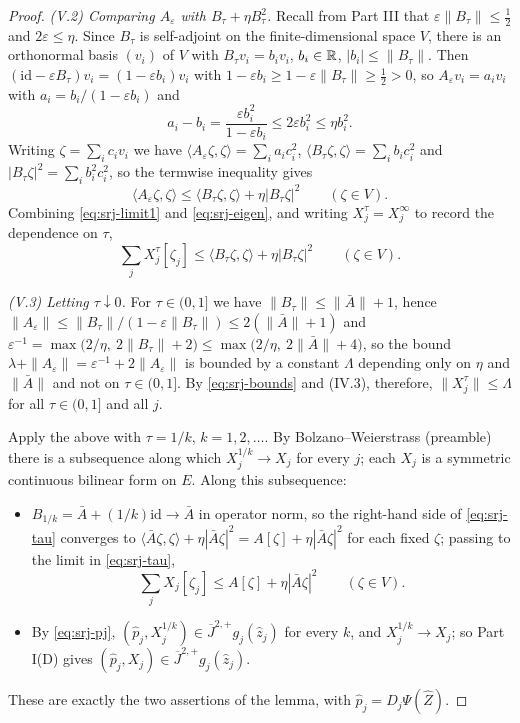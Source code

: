 \begin{proof}
\emph{(V.2) Comparing $A_\varepsilon$ with $B_\tau+\eta B_\tau^2$.}
Recall from Part III that $\varepsilon\|B_\tau\|\le\tfrac12$ and
$2\varepsilon\le\eta$. Since $B_\tau$ is self-adjoint on the
finite-dimensional space $V$, there is an orthonormal basis $(v_i)$ of $V$ with
$B_\tau v_i=b_iv_i$, $b_i\in\mathbb{R}$, $|b_i|\le\|B_\tau\|$. Then
$(\mathrm{id}-\varepsilon B_\tau)v_i=(1-\varepsilon b_i)v_i$ with
$1-\varepsilon b_i\ge1-\varepsilon\|B_\tau\|\ge\tfrac12>0$, so
$A_\varepsilon v_i=a_iv_i$ with $a_i=b_i/(1-\varepsilon b_i)$ and
\[
  a_i-b_i=\frac{\varepsilon b_i^2}{1-\varepsilon b_i}\le2\varepsilon b_i^2
   \le\eta b_i^2 .
\]
Writing $\zeta=\sum_ic_iv_i$ we have $\langle A_\varepsilon\zeta,\zeta\rangle
=\sum_ia_ic_i^2$, $\langle B_\tau\zeta,\zeta\rangle=\sum_ib_ic_i^2$ and
$|B_\tau\zeta|^2=\sum_ib_i^2c_i^2$, so the termwise inequality gives
\begin{equation}\label{eq:srj-eigen}
  \langle A_\varepsilon\zeta,\zeta\rangle
   \le\langle B_\tau\zeta,\zeta\rangle+\eta|B_\tau\zeta|^2\qquad(\zeta\in V).
\end{equation}
Combining \eqref{eq:srj-limit1} and \eqref{eq:srj-eigen}, and writing
$X_j^{\tau}=X_j^\infty$ to record the dependence on $\tau$,
\begin{equation}\label{eq:srj-tau}
  \sum_jX_j^{\tau}[\zeta_j]
   \le\langle B_\tau\zeta,\zeta\rangle+\eta|B_\tau\zeta|^2\qquad(\zeta\in V).
\end{equation}

\emph{(V.3) Letting $\tau\downarrow0$.}
For $\tau\in(0,1]$ we have $\|B_\tau\|\le\|\bar A\|+1$, hence
$\|A_\varepsilon\|\le\|B_\tau\|/(1-\varepsilon\|B_\tau\|)\le2(\|\bar A\|+1)$ and
$\varepsilon^{-1}=\max\bigl(2/\eta,\ 2\|B_\tau\|+2\bigr)
\le\max\bigl(2/\eta,\ 2\|\bar A\|+4\bigr)$, so the bound
$\lambda+\|A_\varepsilon\|=\varepsilon^{-1}+2\|A_\varepsilon\|$ is bounded by a
constant $\Lambda$ depending only on $\eta$ and $\|\bar A\|$ and not on
$\tau\in(0,1]$. By \eqref{eq:srj-bounds} and (IV.3), therefore,
$\|X_j^\tau\|\le\Lambda$ for all $\tau\in(0,1]$ and all $j$.

Apply the above with $\tau=1/k$, $k=1,2,\dots$. By Bolzano--Weierstrass
(preamble) there is a subsequence along which $X_j^{1/k}\to X_j$ for every $j$;
each $X_j$ is a symmetric continuous bilinear form on $E$. Along this
subsequence:
\begin{itemize}
\item $B_{1/k}=\bar A+(1/k)\mathrm{id}\to\bar A$ in operator norm, so the
right-hand side of \eqref{eq:srj-tau} converges to
$\langle\bar A\zeta,\zeta\rangle+\eta|\bar A\zeta|^2=A[\zeta]+\eta|\bar A\zeta|^2$
for each fixed $\zeta$; passing to the limit in \eqref{eq:srj-tau},
\[
  \sum_jX_j[\zeta_j]\le A[\zeta]+\eta|\bar A\zeta|^2\qquad(\zeta\in V).
\]
\item By \eqref{eq:srj-pj}, $(\widehat p_j,X_j^{1/k})\in
\overline J^{2,+}g_j(\widehat z_j)$ for every $k$, and
$X_j^{1/k}\to X_j$; so Part I(D) gives
$(\widehat p_j,X_j)\in\overline J^{2,+}g_j(\widehat z_j)$.
\end{itemize}
These are exactly the two assertions of the lemma, with
$\widehat p_j=D_j\Psi(\widehat Z)$.
\end{proof}
